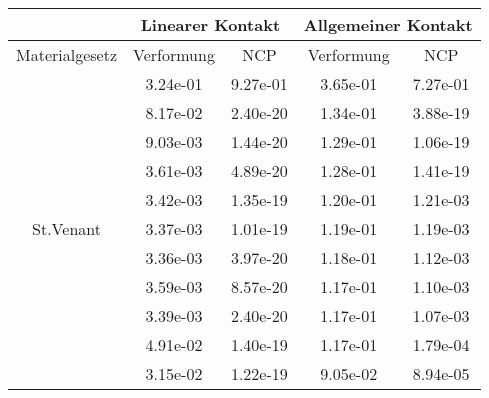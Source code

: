 \begin{table} 
\centering 
\begin{tabular}{c|cc|cc|} 
\cline{2-5} 
 & \multicolumn{2}{|c|}{Linearer Kontakt} & \multicolumn{2}{|c|}{Allgemeiner Kontakt} \\ 
\hline 
\multicolumn{1}{|c|}{Materialgesetz} & \multicolumn{1}{c|}{Verformung} & \multicolumn{1}{c|}{NCP} & \multicolumn{1}{c|}{Verformung} & \multicolumn{1}{c|}{NCP} \\ 
\hline 
\multicolumn{1}{|c|}{\multirow{53}{*}{St.Venant}} &\multicolumn{1}{|c|}{  3.24e-01} & \multicolumn{1}{|c|}{  9.27e-01} & \multicolumn{1}{|c|}{  3.65e-01} & \multicolumn{1}{|c|}{  7.27e-01} \\ 
\multicolumn{1}{|c|}{} & \multicolumn{1}{|c|}{  8.17e-02} & \multicolumn{1}{|c|}{  2.40e-20} & \multicolumn{1}{|c|}{  1.34e-01} & \multicolumn{1}{|c|}{  3.88e-19} \\ 
\multicolumn{1}{|c|}{} & \multicolumn{1}{|c|}{  9.03e-03} & \multicolumn{1}{|c|}{  1.44e-20} & \multicolumn{1}{|c|}{  1.29e-01} & \multicolumn{1}{|c|}{  1.06e-19} \\ 
\multicolumn{1}{|c|}{} & \multicolumn{1}{|c|}{  3.61e-03} & \multicolumn{1}{|c|}{  4.89e-20} & \multicolumn{1}{|c|}{  1.28e-01} & \multicolumn{1}{|c|}{  1.41e-19} \\ 
\multicolumn{1}{|c|}{} & \multicolumn{1}{|c|}{  3.42e-03} & \multicolumn{1}{|c|}{  1.35e-19} & \multicolumn{1}{|c|}{  1.20e-01} & \multicolumn{1}{|c|}{  1.21e-03} \\ 
\multicolumn{1}{|c|}{} & \multicolumn{1}{|c|}{  3.37e-03} & \multicolumn{1}{|c|}{  1.01e-19} & \multicolumn{1}{|c|}{  1.19e-01} & \multicolumn{1}{|c|}{  1.19e-03} \\ 
\multicolumn{1}{|c|}{} & \multicolumn{1}{|c|}{  3.36e-03} & \multicolumn{1}{|c|}{  3.97e-20} & \multicolumn{1}{|c|}{  1.18e-01} & \multicolumn{1}{|c|}{  1.12e-03} \\ 
\multicolumn{1}{|c|}{} & \multicolumn{1}{|c|}{  3.59e-03} & \multicolumn{1}{|c|}{  8.57e-20} & \multicolumn{1}{|c|}{  1.17e-01} & \multicolumn{1}{|c|}{  1.10e-03} \\ 
\multicolumn{1}{|c|}{} & \multicolumn{1}{|c|}{  3.39e-03} & \multicolumn{1}{|c|}{  2.40e-20} & \multicolumn{1}{|c|}{  1.17e-01} & \multicolumn{1}{|c|}{  1.07e-03} \\ 
\multicolumn{1}{|c|}{} & \multicolumn{1}{|c|}{  4.91e-02} & \multicolumn{1}{|c|}{  1.40e-19} & \multicolumn{1}{|c|}{  1.17e-01} & \multicolumn{1}{|c|}{  1.79e-04} \\ 
\multicolumn{1}{|c|}{} & \multicolumn{1}{|c|}{  3.15e-02} & \multicolumn{1}{|c|}{  1.22e-19} & \multicolumn{1}{|c|}{  9.05e-02} & \multicolumn{1}{|c|}{  8.94e-05} \\ 

\end{tabular}
\end{table}
